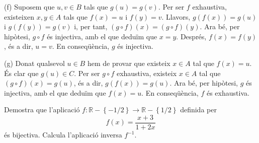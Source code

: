 \begin{solucio}
(f) Suposem que $u,v\in B$ tals que $g(u)=g(v)$. Per ser $f$ exhaustiva,
existeixen $x,y\in A$ tals que $f(x)=u$ i $f(y)=v$. Llavors, $g\left(
f(x)\right) =g(u)$ i $g\left( f(y)\right) =g(v)$ i, per tant, $(g\circ
f)(x)=(g\circ f)(y)$. Ara bé, per hipòtesi, $g\circ f$ és
injectiva, amb el que deduïm que $x=y$. Després, $f(x)=f(y)$, és a dir, $u=v$. En conseqüència, $g$ és injectiva.

(g) Donat qualsevol $u\in B$ hem de provar que existeix $x\in A$ tal que $%
f(x)=u$. És clar que $g(u)\in C$. Per ser $g\circ f$ exhaustiva,
existeix $x\in A$ tal que $(g\circ f)(x)=g(u)$, és a dir, $g\left(
f(x)\right) =g(u)$. Ara bé, per hipòtesi, $g$ és injectiva, amb
el que deduïm que $f(x)=u$. En conseqüència, $f$ és
exhaustiva.
\end{solucio}

\begin{exercici}
Demostra que l'aplicació $f:\mathbb{R}-\left\{ -1/2\right\}
\longrightarrow \mathbb{R}-\left\{ 1/2\right\} $ definida per%
\begin{equation*}
f(x)=\frac{x+3}{1+2x}
\end{equation*}%
és bijectiva. Calcula l'aplicació inversa $f^{-1}$.
\end{exercici}

